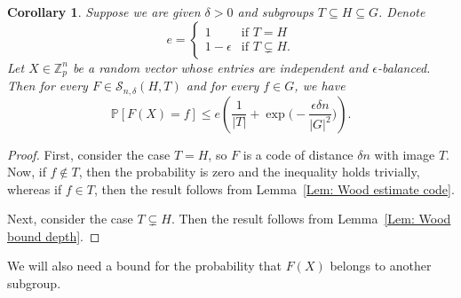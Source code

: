 \documentclass[12pt]{amsart}
\newtheorem{corollary}{Corollary}[theorem]
\theoremstyle{definition}
\newcommand{\PPP}{\mathbb{P}}
\newcommand{\SSS}[3]{\mathcal{S}_{#1}(#2,#3)}
\newcommand{\abs}[1]{\vert#1\vert}
\newcommand{\Zp}{\Z_p}
\newcommand{\Z}{\mathbb{Z}}
\begin{document}
\begin{corollary}\label{Cor: combined bound}
Suppose we are given $\delta>0$ and subgroups $T\subseteq H\subseteq G$.
Denote
\[
e=\begin{cases}
1&\text{if } T=H\\
1-\epsilon &\text{if }T\subsetneq H.
\end{cases}
\]
Let $X\in\Zp^n$ be a random vector whose entries are independent and $\epsilon$-balanced.
Then for every $F\in\SSS{n,\delta}{H}{T}$ and for every $f\in G$, we have
\[
\PPP[F(X)=f]
\leq e 
 \left(\frac{1}{\abs{T}}+\exp\Big(-\frac{\epsilon\delta n}{|G|^2}\Big) \right).
\]
\end{corollary}
\begin{proof}
First, consider the case $T=H$, so $F$ is a code of distance $\delta n$ with image $T$. Now, if $f\notin T$, then the probability is zero and the inequality holds trivially, whereas if $f\in T$, then the result follows from Lemma~\ref{Lem: Wood estimate code}.

Next, consider the case $T\subsetneq H$. Then the result follows from Lemma~\ref{Lem: Wood bound depth}.
\end{proof}

We will also need a bound for the probability that $F(X)$ belongs to another subgroup.
\end{document}
